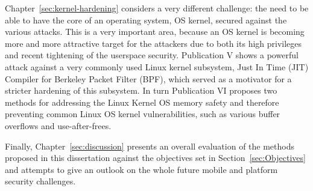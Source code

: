 Chapter~\ref{sec:kernel-hardening} considers a very different challenge: the need to be able to have the core of an operating system, OS kernel, secured against the various attacks. This is a very important area, because an OS kernel is becoming more and more attractive target for the attackers due to both its high privileges and recent tightening of the userspace security. Publication V shows a powerful attack against a very commonly used Linux kernel subsystem, Just In Time (JIT) Compiler for Berkeley Packet Filter (BPF), which served as a motivator for a stricter hardening of this subsystem. In turn Publication VI proposes two methods for addressing the Linux Kernel OS memory safety and therefore preventing common Linux OS kernel vulnerabilities, such as various buffer overflows and use-after-frees. 

Finally, Chapter~\ref{sec:discussion} presents an overall evaluation of the methods proposed in this dissertation against the objectives set in Section~\ref{sec:Objectives} and attempts to give an outlook on the whole future mobile and platform security challenges. 

